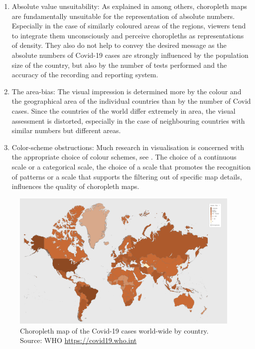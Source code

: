 \documentclass[article]{jdssv}\usepackage[]{graphicx}\usepackage[]{color}
\begin{document}
\begin{enumerate}
\item Absolute value unsuitability: As explained in \citep{monmonier2005, slocum2008, speckmann2010} among others, choropleth maps are fundamentally unsuitable for the representation of absolute numbers. Especially in the case of similarly coloured areas of the regions, viewers tend to integrate them unconsciously and perceive choropleths as representations of density. They also do not help to convey the desired message as the absolute numbers of Covid-19 cases are strongly influenced by the population size of the country, but also by the number of tests performed and the accuracy of the recording and reporting system.
\item The area-bias: The visual impression is determined more by the colour and the geographical area of the individual countries than by the number of Covid cases. Since the countries of the world differ extremely in area, the visual assessment is distorted, especially in the case of neighbouring countries with similar numbers but different areas.
\item Color-scheme obstructions: Much research in visualisation is concerned with the appropriate choice of colour schemes, see \citep{brewer1997, color2021}. The choice of a continuous scale or a categorical scale, the choice of a scale that promotes the recognition of patterns or a scale that supports the filtering out of specific map details, influences the quality of choropleth maps.  
\end{enumerate}

\begin{figure}
	\includegraphics[width = 0.98\textwidth]{Figures_Web/who_totalcases_choro.png}
	\caption{Choropleth map of the Covid-19 cases world-wide by country. Source: WHO \url{https://covid19.who.int}}
	\label{fig:choro1}
\end{figure}
\end{document}
